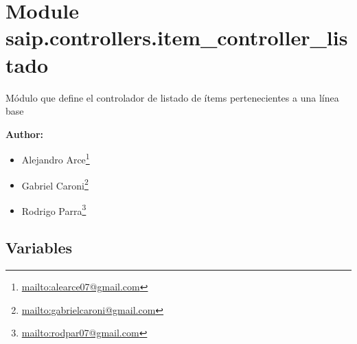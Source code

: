 %
%
%


\section{Module saip.controllers.item\_controller\_listado}

    \label{saip:controllers:item_controller_listado}
Módulo que define el controlador de listado de ítems pertenecientes a una 
línea base

\textbf{Author:} \begin{itemize}
\setlength{\parskip}{0.6ex}
  \item Alejandro 
    Arce\footnote{\href{mailto:alearce07@gmail.com}{mailto:alearce07@gmail.com}}

  \item Gabriel 
    Caroni\footnote{\href{mailto:gabrielcaroni@gmail.com}{mailto:gabrielcaroni@gmail.com}}

  \item Rodrigo 
    Parra\footnote{\href{mailto:rodpar07@gmail.com}{mailto:rodpar07@gmail.com}}

\end{itemize}





  \subsection{Variables}

